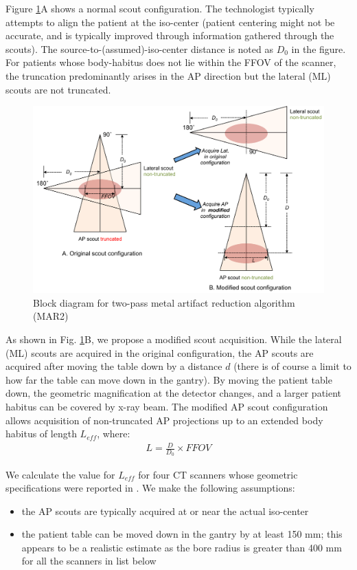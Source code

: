\documentclass[]{spie}
\begin{document}
Figure \ref{fig:blockdiag_mar2}A shows a normal scout configuration. The technologist typically attempts to align the patient at the iso-center (patient centering might not be accurate, and is typically improved through information gathered through the scouts). The source-to-(assumed)-iso-center distance is noted as $D_0$ in the figure. For  patients whose body-habitus does not lie within the FFOV of the scanner, the truncation predominantly arises in the AP direction but the lateral (ML) scouts are not truncated. 

\begin{figure}[hbtp]
\centering
\includegraphics[width=15 cm]{figures/scoutIT_geometry}
\caption{Block diagram for two-pass metal artifact reduction algorithm (MAR2) \label{fig:blockdiag_mar2}
}
\end{figure}

As shown in Fig. \ref{fig:blockdiag_mar2}B, we propose a modified scout acquisition. While the lateral (ML) scouts are acquired in the original configuration, the AP scouts are acquired after moving the table down by a distance $d$ (there is of course a limit to how far the table can move down in the gantry). By moving the patient table down, the geometric magnification at the detector changes, and a larger patient habitus can be covered by x-ray beam. The modified AP scout configuration allows acquisition of non-truncated AP projections up to an extended body habitus of length $L_{eff}$, where:
\begin{align}
L = \frac{D}{D_0}\times FFOV
\end{align}

We calculate the value for $L_{eff}$ for four CT scanners whose geometric specifications were reported in \cite{ImPACTCenterforEvidencebasedPurchasing2009}. We make the following assumptions:
\begin{itemize}
	\item the AP scouts are typically acquired at or near the actual iso-center
	\item the patient table can be moved down in the gantry by at least 150 mm; this appears to be a realistic estimate as the bore radius is greater than 400 mm for all the scanners in list below
\end{itemize}
\end{document}
